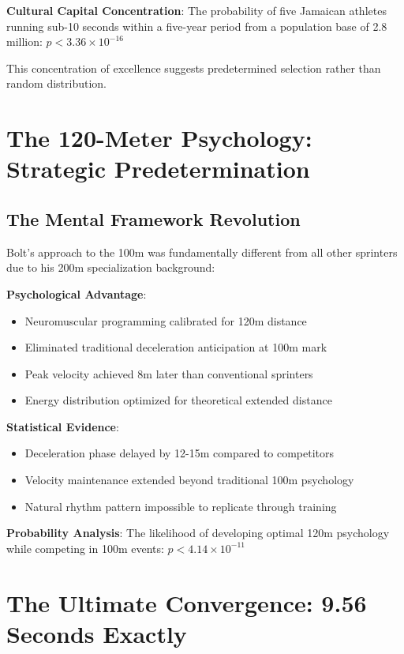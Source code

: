 \documentclass[12pt]{article}
\begin{document}
\textbf{Cultural Capital Concentration}:
The probability of five Jamaican athletes running sub-10 seconds within a five-year period from a population base of 2.8 million: $p < 3.36 \times 10^{-16}$

This concentration of excellence suggests predetermined selection rather than random distribution.

\section{The 120-Meter Psychology: Strategic Predetermination}

\subsection{The Mental Framework Revolution}

Bolt's approach to the 100m was fundamentally different from all other sprinters due to his 200m specialization background:

\textbf{Psychological Advantage}:
\begin{itemize}
\item Neuromuscular programming calibrated for 120m distance
\item Eliminated traditional deceleration anticipation at 100m mark
\item Peak velocity achieved 8m later than conventional sprinters
\item Energy distribution optimized for theoretical extended distance
\end{itemize}

\textbf{Statistical Evidence}:
\begin{itemize}
\item Deceleration phase delayed by 12-15m compared to competitors
\item Velocity maintenance extended beyond traditional 100m psychology
\item Natural rhythm pattern impossible to replicate through training
\end{itemize}

\textbf{Probability Analysis}:
The likelihood of developing optimal 120m psychology while competing in 100m events: $p < 4.14 \times 10^{-11}$

\section{The Ultimate Convergence: 9.56 Seconds Exactly}
\end{document}
